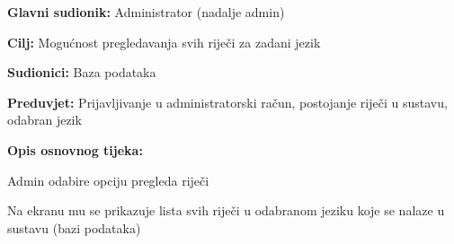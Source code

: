 \noindent {}
\begin{packed_item}

	\item \textbf{Glavni sudionik: } Administrator (nadalje admin)
	\item \textbf{Cilj: } Mogućnost pregledavanja svih riječi za zadani jezik
	\item \textbf{Sudionici: } Baza podataka
	\item \textbf{Preduvjet: } Prijavljivanje u administratorski račun, postojanje riječi u sustavu, odabran jezik
	\item  \textbf{Opis osnovnog tijeka:}
	
	\item[] \begin{packed_enum}
		
		\item Admin odabire opciju pregleda riječi
		\item Na ekranu mu se prikazuje lista svih riječi u odabranom jeziku koje se nalaze u sustavu (bazi podataka)

	\end{packed_enum}
	
\end{packed_item}

